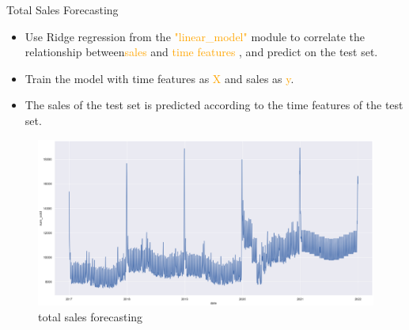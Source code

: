 \documentclass[
 size=14pt,
 paper=smartboard,  %
 mode=present, 		%
 display=slides, 	%
 style=tuliplab,  	%
 pauseslide,
 fleqn,leqno]{powerdot}
\begin{document}
\begin{slide}[toc=,bm=]{Total Sales Forecasting}
		\begin{itemize}
	\item
	Use Ridge regression from the  \textcolor{orange}{"linear\_model"} module to correlate the relationship between\textcolor{orange}{sales}  and \textcolor{orange}{time features} , and predict on the test set.
	\item
	Train the model with time features as \textcolor{orange}{X} and sales as \textcolor{orange}{y}. 
		\item 
		The sales of the test set is predicted according to the time features of the test set.
\end{itemize}
	\begin{figure}
	\centering
	\includegraphics[scale=0.34]{total-sales.eps}
	\caption{total sales forecasting}\label{fig:OutAspect-target}
\end{figure}

\end{slide}
\end{document}

